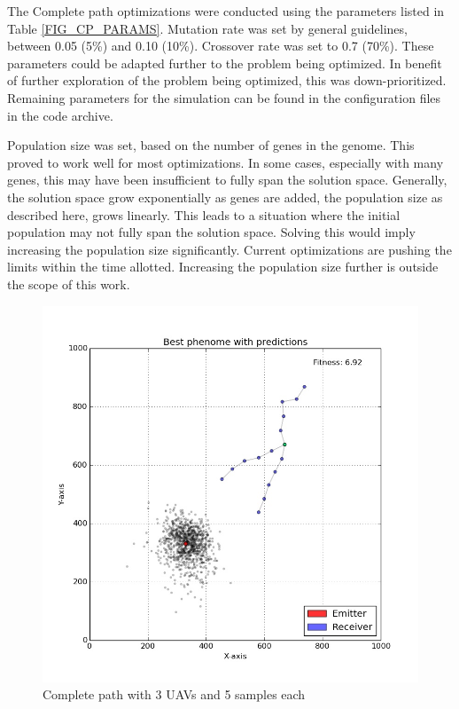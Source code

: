 \documentclass[10pt,a4paper]{book}
\begin{document}
The Complete path optimizations were conducted using the parameters listed in Table \ref{FIG_CP_PARAMS}. Mutation rate was set by general guidelines, between 0.05 (5\%) and 0.10 (10\%). Crossover rate was set to 0.7 (70\%). These parameters could be adapted further to the problem being optimized. In benefit of further exploration of the problem being optimized, this was down-prioritized. Remaining parameters for the simulation can be found in the configuration files in the code archive.

Population size was set, based on the number of genes in the genome. This proved to work well for most optimizations. In some cases, especially with many genes, this may have been insufficient to fully span the solution space. Generally, the solution space grow exponentially as genes are added, the population size as described here, grows linearly. This leads to a situation where the initial population may not fully span the solution space. Solving this would imply increasing the population size significantly. Current optimizations are pushing the limits within the time allotted. Increasing the population size further is outside the scope of this work.

\begin{figure}[H]
\centering
\includegraphics[width=120mm]{uav3steps5.jpg}
\caption{Complete path with 3 \glspl{UAV} and 5 samples each}
\label{completepath_uav3_step5}
\end{figure}
\end{document}
